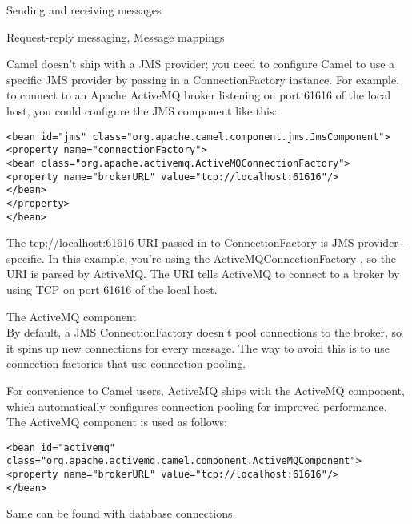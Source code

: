 \documentclass[Screen16to9,17pt]{foils}
\begin{document}

\begin{list2}
\item Sending and receiving messages
\item Request-­reply messaging, Message mappings
\end{list2}


Camel doesn’t ship with a JMS provider; you need to configure Camel to use a specific
JMS provider by passing in a ConnectionFactory instance. For example, to connect to
an Apache ActiveMQ broker listening on port 61616 of the local host, you could configure the JMS component like this:

\begin{verbatim}
<bean id="jms" class="org.apache.camel.component.jms.JmsComponent">
<property name="connectionFactory">
<bean class="org.apache.activemq.ActiveMQConnectionFactory">
<property name="brokerURL" value="tcp://localhost:61616"/>
</bean>
</property>
</bean>
\end{verbatim}

The tcp://localhost:61616 URI passed in to ConnectionFactory is JMS provider-­
specific. In this example, you’re using the ActiveMQConnectionFactory , so the URI is
parsed by ActiveMQ. The URI tells ActiveMQ to connect to a broker by using TCP on
port 61616 of the local host.


The ActiveMQ component\\
By default, a JMS ConnectionFactory doesn’t pool connections to the broker, so it
spins up new connections for every message. The way to avoid this is to use connection
factories that use connection pooling.

For convenience to Camel users, ActiveMQ ships with the ActiveMQ component, which
automatically configures connection pooling for improved performance. The ActiveMQ
component is used as follows:

\begin{verbatim}
<bean id="activemq"
class="org.apache.activemq.camel.component.ActiveMQComponent">
<property name="brokerURL" value="tcp://localhost:61616"/>
</bean>
\end{verbatim}

Same can be found with database connections.

\end{document}
